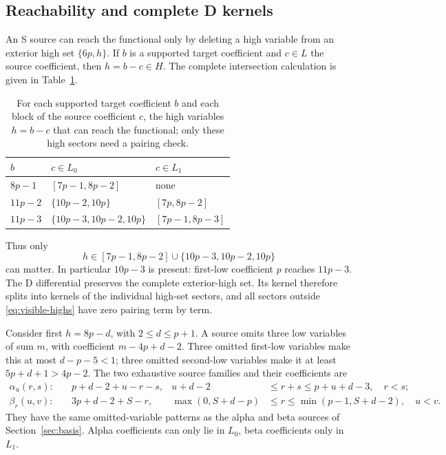 \documentclass[11pt]{article}
\theoremstyle{definition}
\theoremstyle{remark}
\begin{document}
\subsection{Reachability and complete D kernels}

An S source can reach the functional only by deleting a high variable
from an exterior high set $\{6p,h\}$. If $b$ is a supported target
coefficient and $c\in L$ the source coefficient, then $h=b-c\in H$.
The complete intersection calculation is given in Table~\ref{tab:visible}.
\begin{table}[t]
\centering\small
\begin{tabular}{lll}
\toprule
$b$ & $c\in L_0$ & $c\in L_1$\\
\midrule
$8p-1$ & $[7p-1,8p-2]$ & none\\
$11p-2$ & $\{10p-2,10p\}$ & $[7p,8p-2]$\\
$11p-3$ & $\{10p-3,10p-2,10p\}$ & $[7p-1,8p-3]$\\
\bottomrule
\end{tabular}
\caption{For each supported target coefficient $b$ and each block of the source coefficient $c$, the
high variables $h=b-c$ that can reach the functional; only these high sectors need a pairing check.}
\label{tab:visible}
\end{table}
Thus only
\begin{equation}\label{eq:visible-highs}
 h\in[7p-1,8p-2]\cup\{10p-3,10p-2,10p\}
\end{equation}
can matter. In particular $10p-3$ is present: first-low coefficient
$p$ reaches $11p-3$. The D differential preserves the complete
exterior-high set. Its kernel therefore splits into kernels of the
individual high-set sectors, and all sectors outside
\eqref{eq:visible-highs} have zero pairing term by term.

Consider first $h=8p-d$, with $2\leq d\leq p+1$. A source omits
three low variables of sum $m$, with coefficient $m-4p+d-2$.
Three omitted first-low variables make this at most $d-p-5<1$;
three omitted second-low variables make it at least $5p+d+1>4p-2$.
The two exhaustive source families and their coefficients are
\begin{align*}
 \alpha_u(r,s):&\quad p+d-2+u-r-s,
 &u+d-2&\leq r+s\leq p+u+d-3,\quad r<s;\\
 \beta_r(u,v):&\quad 3p+d-2+S-r,
 &\max(0,S+d-p)&\leq r\leq\min(p-1,S+d-2),\quad u<v.
\end{align*}
They have the same omitted-variable patterns as the alpha and beta
sources of Section~\ref{sec:basis}. Alpha coefficients can only lie
in $L_0$, beta coefficients only in $L_1$.
\end{document}
